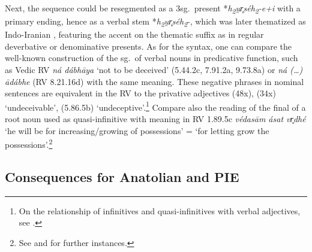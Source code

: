 \documentclass[output=paper,colorlinks,citecolor=brown]{langscibook}
\begin{document}
Next, the sequence could be resegmented as a 3sg.\ present *\textit{h\textsubscript{2}u̯r̥séh\textsubscript{2}-e+i} with a primary ending, hence as a verbal stem *\textit{h\textsubscript{2}u̯r̥séh\textsubscript{2}}-, which was later thematized as Indo-Iranian , featuring the accent on the thematic suffix as in regular deverbative or denominative presents. As for the syntax, one can compare the well-known construction of the  sg.\ of verbal nouns in predicative function, such as Vedic RV \textit{ná dábhāya} ‘not to be deceived’ (5.44.2c, 7.91.2a, 9.73.8a) or \textit{ná (…) ādábhe} (RV 8.21.16d) with the same meaning. These negative phrases in nominal sentences are equivalent in the RV to the privative adjectives  (48x),  (34x) ‘undeceivable’,  (5.86.5b) ‘undeceptive’.\footnote{On the relationship of infinitives and quasi-infinitives with verbal adjectives, see \citealt{Renou1937}.}  Compare also the reading of the final  of a root noun used as quasi-infinitive with  meaning in RV 1.89.5c \textit{védasām ásat vr̥dhé} ‘he will be for increasing/growing of possessions’ = ‘for letting grow the possessions’.\footnote{See \citealt[95, 96]{Gippert1978} and \citealt[23--25]{HettrichStueber2018} for further instances.} 

\subsection{Consequences for Anatolian and PIE}
\end{document}
